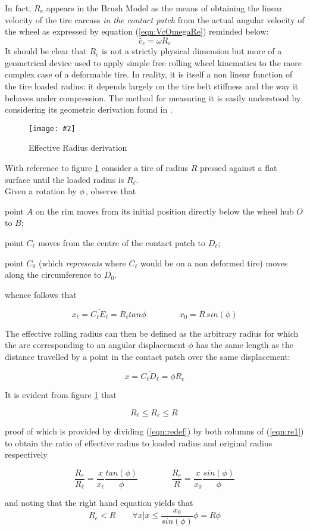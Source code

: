 \documentclass[12pt,a4paper]{report}
\newcommand{\figura}[5][htbp]{
\begin{figure}[#1]
\begin{center}
\texttt{[image: \#2]}
\caption{#4}\label{#5}
\end{center}
\end{figure}
}
\newcommand{\eq}[2]{
\begin{equation} \label{#1}
#2
\end{equation}
}
\newcommand{\req}[1]{
(\ref{#1})
}
\begin{document}
In fact, $R_e$ appears in the Brush Model as the means of obtaining  the linear velocity of the tire carcass \emph{in the contact patch} from the actual angular velocity of the wheel as expressed by equation \req{eqn:VcOmegaRe} reminded below:
$$ \bar{v}_c=\omega R_e $$
It should be clear that $R_e$ is not a strictly physical dimension but more of a geometrical device used to apply simple free rolling wheel kinematics to the more complex case of a deformable tire.
In reality, it is itself a non linear function of the tire loaded radius: it depends largely on the tire belt stiffness and the way it behaves under compression.
The method for measuring it is easily understood by considering its geometric derivation found in \cite{Misset}.

\figura{pix/effective_rolling_radius.jpg}{width=14cm}{Effective Radius derivation}{fig:re1}
With reference to figure \ref{fig:re1} consider a tire of radius $R$ pressed against a flat surface until the loaded radius is $R_\ell$.\\
Given a rotation by $\phi \,$, observe that
\begin{description}
\item point $A$ on the rim moves from its initial position directly below the wheel hub $O$ to $B$;
\item point $C_\ell$ moves from the centre of the contact patch to $D_\ell$;
\item point $C_0$ (which \emph{represents} where $C_\ell$ would be on a non deformed tire) moves along the circumference to $D_0$.
\end{description}
whence follows that
\eq{eqn:re1}{x_\ell =\overline{C_\ell E_\ell} =  R_\ell tan\phi \qquad \qquad x_0 = R\, sin(\phi)}
The effective rolling radius can then be defined as the arbitrary radius for which the arc corresponding to an angular displacement $\phi$ has the same length as the distance travelled by a point in the contact patch over the same displacement:
\eq{eqn:redef}{x =\overline{C_\ell D_\ell} = \phi R_e }
It is evident from figure \ref{fig:re1} that 
\eq{eqn:relims}{R_\ell \leq R_e \leq R \,}
proof of which is provided by dividing \req{eqn:redef} by both columns of \req{eqn:re1} to obtain the ratio of effective radius to loaded radius and original radius respectively
\eq{eqn:reratios}{\frac{R_e}{R_\ell} = \frac{x}{x_\ell} \frac{tan(\phi)}{\phi} \qquad \qquad \frac{R_e}{R} = \frac{x}{x_0} \frac{sin(\phi)}{\phi}}
and noting that the right hand equation yields that
$$
R_e < R \qquad \forall x | x \leq \frac{x_0}{sin(\phi)} \phi = R \phi
$$
\end{document}
